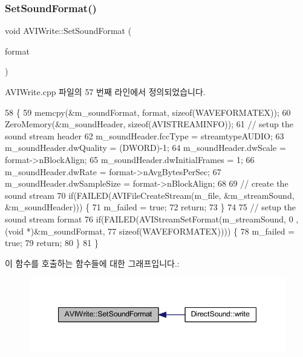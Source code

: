 \subsubsection{\texorpdfstring{Set\+Sound\+Format()}{SetSoundFormat()}}
{\footnotesize\ttfamily void A\+V\+I\+Write\+::\+Set\+Sound\+Format (\begin{DoxyParamCaption}\item[{W\+A\+V\+E\+F\+O\+R\+M\+A\+T\+EX $\ast$}]{format }\end{DoxyParamCaption})}



A\+V\+I\+Write.\+cpp 파일의 57 번째 라인에서 정의되었습니다.


\begin{DoxyCode}
58 \{
59   memcpy(&m\_soundFormat, format, \textcolor{keyword}{sizeof}(WAVEFORMATEX));
60   ZeroMemory(&m\_soundHeader, \textcolor{keyword}{sizeof}(AVISTREAMINFO));
61   \textcolor{comment}{// setup the sound stream header}
62   m\_soundHeader.fccType = streamtypeAUDIO;
63   m\_soundHeader.dwQuality = (DWORD)-1;
64   m\_soundHeader.dwScale = format->nBlockAlign;
65   m\_soundHeader.dwInitialFrames = 1;
66   m\_soundHeader.dwRate = format->nAvgBytesPerSec;
67   m\_soundHeader.dwSampleSize = format->nBlockAlign;
68   
69   \textcolor{comment}{// create the sound stream}
70   \textcolor{keywordflow}{if}(FAILED(AVIFileCreateStream(m\_file, &m\_streamSound, &m\_soundHeader))) \{
71     m\_failed = \textcolor{keyword}{true};
72     \textcolor{keywordflow}{return};
73   \}
74   
75   \textcolor{comment}{// setup the sound stream format}
76   \textcolor{keywordflow}{if}(FAILED(AVIStreamSetFormat(m\_streamSound, 0 , (\textcolor{keywordtype}{void} *)&m\_soundFormat,
77                                \textcolor{keyword}{sizeof}(WAVEFORMATEX)))) \{
78     m\_failed = \textcolor{keyword}{true};
79     \textcolor{keywordflow}{return};
80   \}
81 \}
\end{DoxyCode}
이 함수를 호출하는 함수들에 대한 그래프입니다.\+:
\nopagebreak
\begin{figure}[H]
\begin{center}
\leavevmode
\includegraphics[width=347pt]{class_a_v_i_write_a8d864e6e2cea4147ffa6f24d69fbe339_icgraph}
\end{center}
\end{figure}
\mbox{\label{class_a_v_i_write_a1da91adeefacf0dd4655f5029875c5d6}} 
